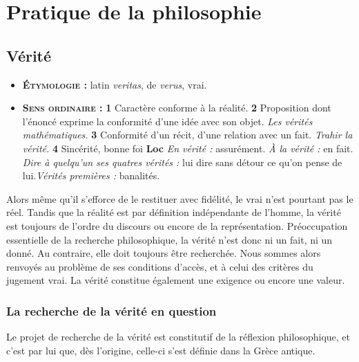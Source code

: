 
\section{Pratique de la philosophie}

\subsection{Vérité}

{\footnotesize
\begin{itemize}[leftmargin=1cm, label=, itemsep=1pt]
\item {\bf \textsc{Étymologie} :} latin {\it veritas},
de {\it verus}, vrai.
\item {\bf \textsc{Sens ordinaire} :} {\bf 1} Caractère
conforme à la réalité. {\bf 2} Proposition dont l'énoncé
exprime la conformité d'une idée avec son objet. {\it Les
vérités mathématiques.} {\bf 3} Conformité d'un récit,
d'une relation avec un fait. {\it Trahir la vérité.}
{\bf 4} Sincérité, bonne foi {\bf Loc} {\it En vérité :}
assurément. {\it À la vérité :} en fait. {\it Dire à
quelqu'un ses quatres vérités :} lui dire sans détour ce qu'on pense de lui.{\it Vérités premières :} banalités.
\end{itemize}
}

Alors même qu'il s'efforce de le restituer
avec fidélité, le vrai n’est pourtant pas le
réel. Tandis que la réalité est par définition
indépendante de l’homme, la
vérité est toujours de l’ordre du discours
ou encore de la représentation.
Préoccupation essentielle de la
recherche philosophique, la vérité n’est
donc ni un fait, ni un donné. Au
contraire, elle doit toujours être recherchée.
Nous sommes alors renvoyés au
problème de ses conditions d'accès, et à
celui des critères du jugement vrai. La
vérité constitue également une exigence
ou encore une valeur.

\subsubsection{La recherche de la vérité en question}

Le projet de recherche de la vérité est
constitutif de la réflexion philosophique,
et c’est par lui que, dès l’origine, celle-ci
s'est définie dans la Grèce antique.

